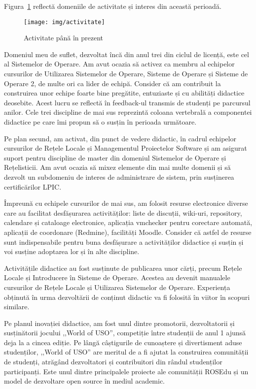\documentclass[11pt,a4paper]{article}
\begin{document}
Figura~\ref{fig:activitate} reflectă domeniile de activitate și interes din
această perioadă.

\begin{figure}[h]
  \begin{center}
    \texttt{[image: img/activitate]}
  \end{center}
  \caption{Activitate până în prezent}
  \label{fig:activitate}
\end{figure}

Domeniul meu de suflet, dezvoltat încă din anul trei din ciclul de licență,
este cel al Sistemelor de Operare. Am avut ocazia să activez ca membru al
echipelor cursurilor de Utilizarea Sistemelor de Operare, Sisteme de Operare
și Sisteme de Operare 2, de multe ori ca lider de echipă. Consider că am
contribuit la construirea unor echipe foarte bine pregătite, entuziaste și cu
abilități didactice deosebite. Acest lucru se reflectă în feedback-ul transmis
de studenți pe parcursul anilor. Cele trei discipline de mai sus reprezintă
coloana vertebrală a componentei didactice pe care îmi propun să o susțin în
perioada următoare.

Pe plan secund, am activat, din punct de vedere didactic, în cadrul echipelor
cursurilor de Rețele Locale și Managementul Proiectelor Software și am
asigurat suport pentru discipline de master din domeniul Sistemelor de Operare
și Rețelisticii. Am avut ocazia să mixez elemente din mai multe domenii și să
dezvolt un subdomeniu de interes de administrare de sistem, prin susținerea
certificărilor LPIC.

Împreună cu echipele cursurilor de mai sus, am folosit resurse electronice
diverse care au facilitat desfășurarea activităților: liste de discuții,
wiki-uri, repository, calendare și cataloage electronice, aplicația vmchecker
pentru corectare automată, aplicații de coordonare (Redmine), facilități
Moodle. Consider că astfel de resurse sunt indispensabile pentru buna
desfășurare a activităților didactice și susțin și voi susține adoptarea lor
și în alte discipline.

Activitățile didactice au fost susținute de publicarea unor cărți, precum
Rețele Locale și Introducere în Sisteme de Operare. Acestea au devenit
manualele cursurilor de Rețele Locale și Utilizarea Sistemelor de Operare.
Experiența obținută în urma dezvoltării de conținut didactic va fi folosită în
viitor în scopuri similare.

Pe planul inovației didactice, am fost unul dintre promotorii, dezvoltatorii
și susținătorii jocului ,,World of USO'', competiție între studenții de anul 1
ajunsă deja la a cincea ediție. Pe lângă câștigurile de cunoaștere și
divertisment aduse studenților, ,,World of USO'' are meritul de a fi ajutat la
construirea comunității de studenți, atrăgând dezvoltatori și contribuitori
din rândul studenților participanți. Este unul dintre principalele proiecte
ale comunității ROSEdu și un model de dezvoltare open source în mediul
academic.
\end{document}

